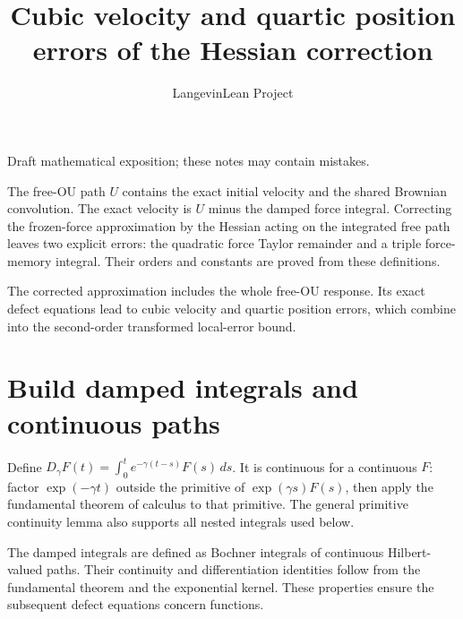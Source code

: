 \documentclass[11pt,a4paper]{article}
\title{\texorpdfstring{Cubic velocity and quartic position errors of the Hessian correction}{Cubic velocity and quartic position errors of the Hessian correction}}
\author{LangevinLean Project}
\date{}
\begin{document}
\maketitle
Draft mathematical exposition; these notes may contain mistakes.


The free-OU path \(U\) contains the exact initial velocity and the shared Brownian convolution. The exact velocity is \(U\) minus the damped force integral. Correcting the frozen-force approximation by the Hessian acting on the integrated free path leaves two explicit errors: the quadratic force Taylor remainder and a triple force-memory integral. Their orders and constants are proved from these definitions.



The corrected approximation includes the whole free-OU response. Its exact defect equations lead to cubic velocity and quartic position errors, which combine into the second-order transformed local-error bound.


\section{\texorpdfstring{Build damped integrals and continuous paths}{Build damped integrals and continuous paths}}


Define \(D_\gamma F(t)=\int_0^te^{-\gamma(t-s)}F(s)\,ds\). It is continuous for a continuous \(F\): factor \(\exp(-\gamma t)\) outside the primitive of \(\exp(\gamma s)F(s)\), then apply the fundamental theorem of calculus to that primitive. The general primitive continuity lemma also supports all nested integrals used below.



The damped integrals are defined as Bochner integrals of continuous Hilbert-valued paths. Their continuity and differentiation identities follow from the fundamental theorem and the exponential kernel. These properties ensure the subsequent defect equations concern functions.
\end{document}
